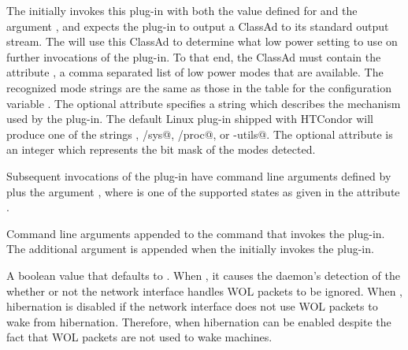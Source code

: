\begin{description}
  The  initially invokes this plug-in with both the
  value defined for 
  and the argument , 
  and expects the plug-in to output a ClassAd to its standard output stream.
  The  will use this ClassAd to determine what low power
  setting to use on further invocations of the plug-in.
  To that end, the ClassAd must contain the attribute
  , a comma separated list of
  low power modes that are available.  
  The recognized mode strings are the same as those in the table for
  the configuration variable .
  The optional attribute  specifies a string 
  which describes the mechanism used by the plug-in.
  The default Linux plug-in shipped with HTCondor will produce 
  one of the strings
  \verb@NONE@, \verb@/sys@, \verb@/proc@, or \verb@pm-utils@.
  The optional attribute 
  is an integer which represents the bit mask of the modes detected.

  Subsequent  invocations of the plug-in have command
  line arguments defined by  plus the
  argument , where 
  is one of the supported states as given in the attribute
  .

\label{param:HibernationPluginArgs}
\item[\Macro{HIBERNATION\_PLUGIN\_ARGS}]
  Command line arguments appended to the command that invokes the plug-in.
  The additional argument  is appended  
  when the  initially invokes the plug-in.

\label{param:HibernationOverrideWOL}
\item[\Macro{HIBERNATION\_OVERRIDE\_WOL}]
  A boolean value that defaults to .
  When , it causes the  daemon's detection of
  the whether or not the network interface handles WOL packets to be ignored.
  When , hibernation is disabled if the network interface
  does not use WOL packets to wake from hibernation.
  Therefore, when  hibernation can be enabled despite
  the fact that WOL packets are not used to wake machines.


\end{description}
